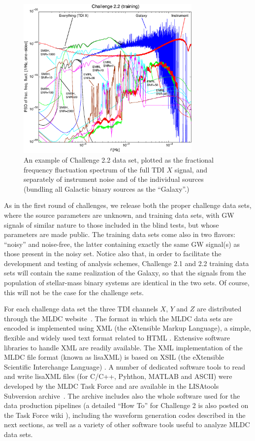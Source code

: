 \documentclass[12pt]{iopart}
\begin{document}
\begin{figure}[htb]

\centerline{\includegraphics[height=8cm]{challenge-2}}
\caption{\protect\footnotesize
An example of Challenge 2.2 data set, plotted as the fractional frequency fluctuation spectrum of the full TDI $X$ signal, and separately of instrument noise and of the individual sources (bundling all Galactic binary sources as the ``Galaxy''.)}
\label{f:C2.2}
\end{figure}

As in the first round of challenges, we release both the proper challenge data sets, where the source parameters are unknown, and training data sets, with GW signals of similar nature to those included in the blind tests, but whose parameters are made public. The training data sets come also in two flavors: ``noisy'' and noise-free, the latter containing exactly the same GW signal(s) as those present in the noisy set. Notice also that, in order to facilitate the development and testing of analysis schemes, Challenge 2.1 and 2.2 training data sets will contain the same realization of the Galaxy, so that the signals from the population of stellar-mass binary systems are identical in the two sets. Of course, this will not be the case for the challenge sets. 

For each challenge data set the three TDI channels $X$, $Y$ and $Z$ are distributed through the MLDC website~\cite{MLDCweb}. The format in which the MLDC data sets are encoded is implemented using XML (the eXtensible Markup Language), a simple, flexible and widely used text format related to HTML \cite{xml}. Extensive software libraries to handle XML are readily available. The XML implementation of the MLDC file format (known as lisaXML) is based on XSIL (the eXtensible Scientific Interchange Language) \cite{xsil}. A number of dedicated software tools to read and write lisaXML files (for C/C++, Pyhthon, MATLAB and ASCII) were developed by the MLDC Task Force and are available in the LISAtools Subversion archive~\cite{lisatools}. The archive includes also the whole software used for the data production pipelines (a detailed ``How To'' for Challenge 2 is also posted on the Task Force wiki \cite{MLDCwiki}), including the waveform generation codes described in the next sections, as well as a variety of other software tools useful to analyze MLDC data sets.
\end{document}
